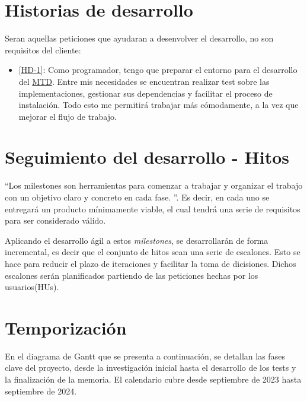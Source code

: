\section{Historias de desarrollo}
Seran aquellas peticiones que ayudaran a desenvolver el desarrollo, no son requisitos del cliente:

\begin{itemize}
    \item \href{https://github.com/marcosrmartin/MTD_Server/issues/16}{[HD-1]}: Como programador, tengo que preparar el entorno para el desarrollo del \href{https://github.com/marcosrmartin/MTD_Server/commit/20df5bb6f5af3de7e557c254ad47089db34845aa}{MTD}. Entre mis necesidades se encuentran realizar test sobre las implementaciones, gestionar sus dependencias y facilitar el proceso de instalación. Todo esto me permitirá trabajar más cómodamente, a la vez que mejorar el flujo de trabajo.
\end{itemize}

\section{Seguimiento del desarrollo - Hitos}
``Los milestones son herramientas para comenzar a trabajar y organizar el trabajo con un objetivo claro y concreto en cada fase.
''\cite{iv}. Es decir, en cada uno se entregará un producto mínimamente viable, el cual tendrá una serie de requisitos para ser considerado válido.

Aplicando el desarrollo ágil a estos \textit{milestones}, se desarrollarán de forma incremental, es decir que el conjunto de hitos sean una serie de escalones. Esto se hace para reducir el plazo de iteraciones y facilitar la toma de dicisiones. Dichos escalones serán planificados partiendo de las peticiones hechas por los usuarios(HUs).

\section{Temporización}
En el diagrama de Gantt que se presenta a continuación, se detallan las fases clave del proyecto, desde la investigación inicial hasta el desarrollo de los tests y la finalización de la memoria. El calendario cubre desde septiembre de 2023 hasta septiembre de 2024.


